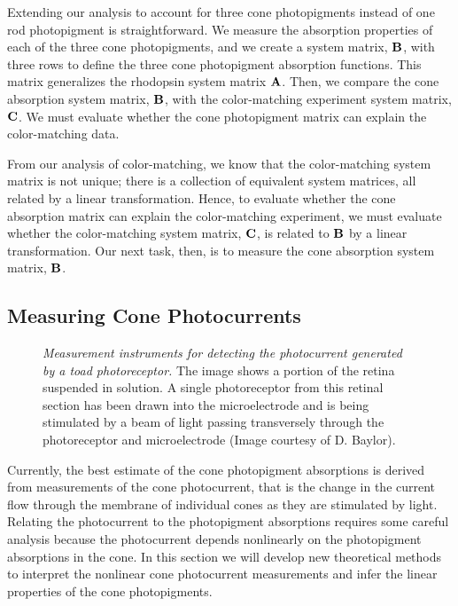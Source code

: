 Extending our analysis
to account for three cone photopigments 
instead of one rod photopigment is straightforward.
We measure the absorption properties of
each of the three cone photopigments,
and we create a system matrix, $\mbox{$\bf B$}$,
with three rows to define
the three cone photopigment absorption functions.
This matrix generalizes the
rhodopsin system matrix $\mbox{$\bf A$}$.
Then, we compare the cone absorption system matrix,
$\mbox{$\bf B$}$, with the color-matching experiment system matrix, $\mbox{\bf C}$.
We must evaluate whether the cone photopigment matrix 
can explain the color-matching data.

From our analysis of color-matching,
we know that the color-matching system matrix is not unique;
there is a collection of equivalent system matrices, all
related by a linear transformation.
Hence, to  evaluate whether the cone absorption matrix
can explain the color-matching experiment,
we must evaluate whether
the color-matching system matrix, $\mbox{\bf C}$,
is related to $\mbox{$\bf B$}$ by a linear transformation.
Our next task, then, is to measure the cone absorption
system matrix, $\mbox{$\bf B$}$.

\subsection*{Measuring Cone Photocurrents}
\begin{figure}
\centerline {
}
\caption[Photoreceptor Measurements]{
{\em Measurement instruments for detecting the photocurrent generated by a toad photoreceptor.}
The image shows a portion of the retina suspended in solution.
A single photoreceptor from this retinal section
has been drawn into
the microelectrode and is being stimulated by
a beam of light passing transversely through the
photoreceptor and microelectrode (Image courtesy of D. Baylor).
}
\label{f3:electrode}
\end{figure}
Currently, the best
estimate of the cone photopigment absorptions
is derived from measurements
of the cone photocurrent, that is the
change in the current flow through the membrane of
individual cones as they are stimulated by light.
Relating the photocurrent to the photopigment absorptions
requires some careful analysis because
the photocurrent depends nonlinearly on the
photopigment absorptions in the cone.
In this section we will develop new theoretical methods to
interpret the nonlinear cone photocurrent measurements
and infer the linear properties of the cone photopigments.

